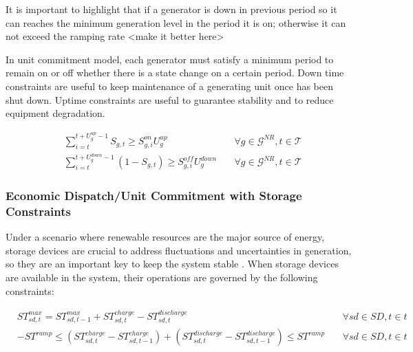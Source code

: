 \documentclass[12pt,LUDisStyle,twosided]{book}
\newcommand{\mc}{\mathcal}
\begin{document}
It is important to highlight that if a generator is down in previous period so it can reaches the minimum generation level in the period it is on; otherwise it can not exceed the ramping rate <make it better here>

In unit commitment model, each generator must satisfy a minimum period to remain on or off whether there is a state change on a certain period. Down time constraints are  useful to keep maintenance of a generating unit once has been shut down. Uptime constraints are useful to guarantee stability and to reduce equipment degradation. 

\begin{subequations}\label{model:ucMinDownUpConstraints}
\begin{alignat}{4}
& \sum_{i = t}^{t + U^{up}_{g} - 1} S_{g,t} \geq S^{on}_{g,i} U^{up}_{g} &~& \forall g \in \mc{G}^{NR}, t \in \mc{T} \label{eq:mindownt} \\
& \sum_{i = t}^{t + U^{down}_{g} - 1} (1 -S_{g,t}) \geq S^{off}_{g,i} U^{down}_{g} &~& \forall g \in \mc{G}^{NR}, t \in \mc{T} \label{eq:minupt}
\end{alignat} 
\end{subequations}

\subsubsection{Economic Dispatch/Unit Commitment with Storage Constraints}

Under a scenario where renewable resources are the major source of energy, storage devices are crucial to address fluctuations and uncertainties in generation, so they are an important key to keep the system stable \cite{dwyer}. When storage devices are available in the system, their operations are governed by the following constraints:

\begin{subequations}\label{model:storageConstraints}
\begin{alignat}{4}
& ST^{max}_{sd,t} = ST^{max}_{sd,t - 1} + ST^{charge}_{sd,t} - ST^{discharge}_{sd,t}  &~& \forall sd \in SD, t \in t \label{eq:storageLimits} \\
&  -ST^{ramp} \leq (ST^{charge}_{sd,t} - ST^{charge}_{sd,t-1}) + (ST^{discharge}_{sd,t} - ST^{discharge}_{sd,t-1}) \leq ST^{ramp}  &~& \forall sd \in SD, t \in t \label{eq:storageRamping}
\end{alignat} 
\end{subequations}
\end{document}
